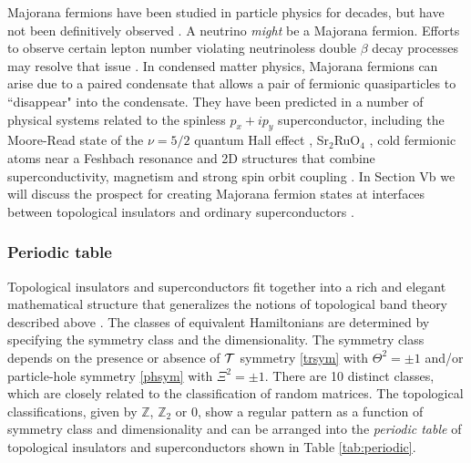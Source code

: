 \documentclass[twocolumn,floatfix,showpacs,rmp,aps]{revtex4}
\begin{document}
	Majorana fermions have been studied in particle
	physics for decades, but have not been definitively observed \cite{majorana37,wilczek09}.
	A neutrino {\it might} be a Majorana fermion.  Efforts to observe
	certain lepton number violating
	neutrinoless double $\beta$ decay processes may resolve that issue \cite{avignone08}.
	In condensed matter physics, Majorana fermions can arise due to
	a paired condensate that allows a pair of fermionic quasiparticles to
	``disappear" into the condensate.  They have been predicted in a
	number of physical systems related to the spinless
	$p_x+i p_y$ superconductor, including the Moore-Read state of the
	$\nu=5/2$ quantum Hall effect \cite{mooreread91,greiter92,readgreen00}, Sr$_2$RuO$_4$ \cite{dassarma06},
	cold fermionic atoms near a Feshbach resonance \cite{gurarie05,tewari07} and
	2D structures that combine superconductivity, magnetism and strong
	spin orbit coupling \cite{sato09,sau10,lee09}.
	In Section Vb we will discuss the prospect for creating
	Majorana fermion states at interfaces between topological
	insulators and ordinary superconductors \cite{fukane08}.
	
	\subsubsection{Periodic table}
	\label{sec:periodic}
	
	Topological insulators and superconductors fit together into a rich and elegant
	mathematical structure that generalizes the notions of topological band
	theory described above \cite{schnyder08,schnyder09,kitaev09,ryu09}.  The classes of equivalent Hamiltonians are determined by specifying the
	symmetry class and the dimensionality.  The symmetry class depends on
	the presence or absence of ${\cal T}$ symmetry \eqref{trsym} with $\Theta^2=\pm 1$ and/or
	particle-hole symmetry \eqref{phsym} with $\Xi^2=\pm 1$.  There are 10 distinct classes,
	which are closely related to the \textcite{altland97} classification of random
	matrices.  The topological classifications, given by
	$\mathbb{Z}$, $\mathbb{Z}_2$ or $0$, show a regular pattern as a function of
	symmetry class and dimensionality and can be arranged into the {\it periodic
		table} of topological insulators and superconductors shown in Table \ref{tab:periodic}.
	
\end{document}
